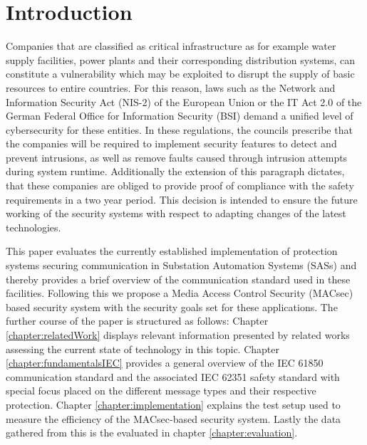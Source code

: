 \documentclass[conference]{IEEEtran}
\begin{document}
\section{Introduction}
\label{chapter:introduction}
\noindent Companies that are classified as critical infrastructure as for example water supply facilities, power plants and their corresponding 
distribution systems, can constitute a vulnerability which may be exploited to disrupt the supply of basic resources to entire countries. For this reason, 
laws such as the Network and Information Security Act (NIS-2) \cite{NIS-2:2022} of the European Union or the IT Act 2.0 \cite{IT-Gesetz_2:2021} of the 
German Federal Office for Information Security (BSI) demand a unified level of cybersecurity for these entities. In these regulations, the councils 
prescribe that the companies will be required to implement security features to detect and prevent intrusions, as well as remove faults caused through 
intrusion attempts during system runtime. \cite[§11 (1d)]{IT-Gesetz_2:2021} Additionally the extension of this paragraph dictates, that these companies 
are obliged to provide proof of compliance with the safety requirements in a two year period. \cite[§11 (1e)]{IT-Gesetz_2:2021} This decision is intended 
to ensure the future working of the security systems with respect to adapting changes of the latest technologies. 

\smallskip
This paper evaluates the currently established implementation of protection systems securing communication in Substation Automation Systems (SASs) and 
thereby provides a brief overview of the communication standard used in these facilities. Following this we propose a Media Access Control Security 
(MACsec) based security system with the security goals set for these applications. The further course of the paper is structured as follows: Chapter 
\ref{chapter:relatedWork} displays relevant information presented by related works assessing the current state of technology in this topic. Chapter 
\ref{chapter:fundamentalsIEC} provides a general overview of the IEC 61850 communication standard and the associated IEC 62351 safety standard with 
special focus placed on the different message types and their respective protection. Chapter \ref{chapter:implementation} explains the test setup used 
to measure the efficiency of the MACsec-based security system. Lastly the data gathered from this is the evaluated in chapter \ref{chapter:evaluation}. 

\end{document}
